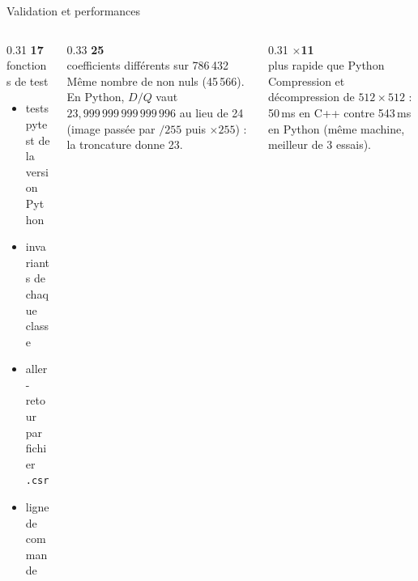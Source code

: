 \documentclass[aspectratio=169,10pt]{beamer}
\newcommand{\code}[1]{\texttt{#1}}
\begin{document}
\begin{frame}{Validation et performances}
  \begin{columns}[T]
    \begin{column}{0.31\textwidth}
      \centering
      {\Huge\bfseries\color{accent} 17}\\[0.2em]
      \small fonctions de test\\[0.6em]
      \begin{itemize}
        \scriptsize
        \item tests pytest de la version Python
        \item invariants de chaque classe
        \item aller-retour par fichier \code{.csr}
        \item ligne de commande
      \end{itemize}
    \end{column}
    \begin{column}{0.33\textwidth}
      \centering
      {\Huge\bfseries\color{accent} 25}\\[0.2em]
      \small coefficients différents sur 786\,432\\[0.6em]
      \scriptsize
      Même nombre de non nuls (45\,566). En Python, $D/Q$ vaut
      $23{,}999\,999\,999\,999\,996$ au lieu de 24 (image passée par $/255$ puis
      $\times255$) : la troncature donne 23.
    \end{column}
    \begin{column}{0.31\textwidth}
      \centering
      {\Huge\bfseries\color{accent} $\times$11}\\[0.2em]
      \small plus rapide que Python\\[0.6em]
      \scriptsize
      Compression et décompression de $512\times512$ : 50\,ms en C++ contre 543\,ms en
      Python (même machine, meilleur de 3 essais).
    \end{column}
  \end{columns}
\end{frame}
\end{document}
